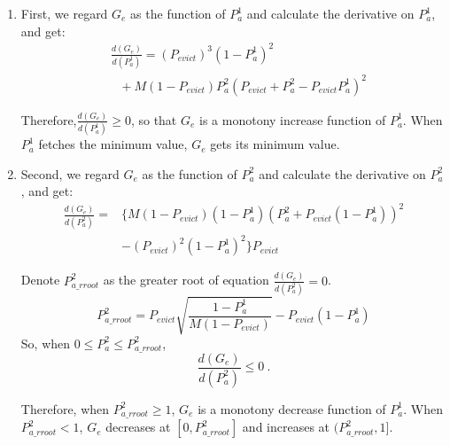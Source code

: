 \begin{enumerate}
\item
    First, we regard $G_e$ as the function of $P_{a}^{\mathfrak{1}}$ and calculate the derivative on $P_{a}^{\mathfrak{1}}$, and get:
    \begin{equation*}
    \begin{aligned}
    &\frac{d(G_e)}{d(P_{a}^{\mathfrak{1}})} = (P_{evict})^{3}(1-P_{a}^{\mathfrak{1}})^2\\
    &\ \ \ +M(1-P_{evict})P_{a}^{\mathfrak{2}}(P_{evict}+P_{a}^{\mathfrak{2}}-P_{evict}P_{a}^{\mathfrak{1}})^{2}
    \end{aligned}
    \end{equation*}

Therefore,$\frac{d(G_e)}{d(P_{a}^{\mathfrak{1}})} \geq 0$, so that $G_e$ is a monotony increase function of $P_{a}^{\mathfrak{1}}$.
When $P_{a}^{\mathfrak{1}}$ fetches the minimum value, $G_e$ gets its minimum value.

\item
Second, we regard $G_e$ as the function of $P_{a}^{\mathfrak{2}}$ and calculate the derivative on $P_{a}^{\mathfrak{2}}$, and get:
\begin{equation*}
\begin{split}
\frac{d(G_e)}{d(P_{a}^{\mathfrak{2}})} = &\{M(1-P_{evict})(1-P_{a}^{\mathfrak{1}})(P_{a}^{\mathfrak{2}}+P_{evict}(1-P_{a}^{\mathfrak{1}}))^2\\
&-(P_{evict})^2(1-P_{a}^{\mathfrak{1}})^2 \}P_{evict}
\end{split}
\end{equation*}

Denote $P_{a\_rroot}^{\mathfrak{2}}$ as the greater root of equation $\frac{d(G_e)}{d(P_{a}^{\mathfrak{2}})}=0$.
\begin{equation*}
  P_{a\_rroot}^{\mathfrak{2}} = P_{evict}\sqrt{\frac{1-P_{a}^{\mathfrak{1}}}{M(1-P_{evict})}}-P_{evict}(1-P_{a}^{\mathfrak{1}})
\end{equation*}
So, when $
0 \leq P_{a}^{\mathfrak{2}} \leq P_{a\_rroot}^{\mathfrak{2}}
$,
$$\frac{d(G_e)}{d(P_{a}^{\mathfrak{2}})} \leq 0 \ .$$

Therefore, when $P_{a\_rroot}^{\mathfrak{2}} \geq 1$, $G_e$ is a monotony decrease function of $P_{a}^{\mathfrak{1}}$.
When $P_{a\_rroot}^{\mathfrak{2}} < 1$, $G_e$ decreases at $[0,P_{a\_rroot}^{\mathfrak{2}}]$ and increases at $(P_{a\_rroot}^{\mathfrak{2}},1]$.


\end{enumerate}
